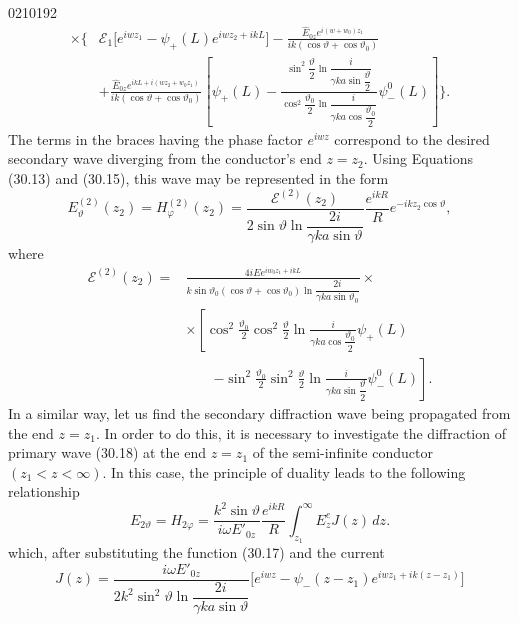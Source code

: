 \begin{scanpage}{0210}{192}
\[
\begin{aligned}
\times\Biggl\{&\mathcal E_1\bigl[e^{iwz_1}-\psi_+(L)e^{iwz_2+ikL}\bigr]-\frac{\hat E_{0z}e^{i(w+w_0)z_1}}{ik(\cos\vartheta+\cos\vartheta_0)}\\
&+\frac{\hat E_{0z}e^{ikL+i(wz_2+w_0z_1)}}{ik(\cos\vartheta+\cos\vartheta_0)}
\left[\psi_+(L)-\frac{\sin^2\dfrac\vartheta2\ln\dfrac{i}{\gamma ka\sin\dfrac\vartheta2}}{\cos^2\dfrac{\vartheta_0}2\ln\dfrac{i}{\gamma ka\cos\dfrac{\vartheta_0}2}}\psi_-^0(L)\right]\Biggr\}.
\end{aligned}\tag{30.29}
\]
The terms in the braces having the phase factor $e^{iwz}$ correspond to the desired secondary wave diverging from the conductor's end $z=z_2$. Using Equations (30.13) and (30.15), this wave may be represented in the form
\[E_\vartheta^{(2)}(z_2)=H_\varphi^{(2)}(z_2)=\frac{\mathcal E^{(2)}(z_2)}{2\sin\vartheta\ln\dfrac{2i}{\gamma ka\sin\vartheta}}\frac{e^{ikR}}R e^{-ikz_2\cos\vartheta},\tag{30.30}\]
where
\[
\begin{aligned}
\mathcal E^{(2)}(z_2)={}&\frac{4iE e^{iw_0z_1+ikL}}{k\sin\vartheta_0(\cos\vartheta+\cos\vartheta_0)\ln\dfrac{2i}{\gamma ka\sin\vartheta_0}}\times\\
&\times\left[\cos^2\frac{\vartheta_0}2\cos^2\frac\vartheta2\ln\frac{i}{\gamma ka\cos\dfrac{\vartheta_0}2}\psi_+(L)\right.\\
&\qquad\left.-\sin^2\frac{\vartheta_0}2\sin^2\frac\vartheta2\ln\frac{i}{\gamma ka\sin\dfrac\vartheta2}\psi_-^0(L)\right].
\end{aligned}\tag{30.31}
\]
In a similar way, let us find the secondary diffraction wave being propagated from the end $z=z_1$. In order to do this, it is necessary to investigate the diffraction of primary wave (30.18) at the end $z=z_1$ of the semi-infinite conductor $(z_1<z<\infty)$. In this case, the principle of duality leads to the following relationship
\[E_{2\vartheta}=H_{2\varphi}=\frac{k^2\sin\vartheta}{i\omega E'_{0z}}\frac{e^{ikR}}R\int_{z_1}^{\infty}E_z^eJ(z)\,dz.\tag{30.32}\]
which, after substituting the function (30.17) and the current
\[J(z)=\frac{i\omega E'_{0z}}{2k^2\sin^2\vartheta\ln\dfrac{2i}{\gamma ka\sin\vartheta}}\bigl[e^{iwz}-\psi_-(z-z_1)e^{iwz_1+ik(z-z_1)}\bigr]\tag{30.33}\]
\end{scanpage}
